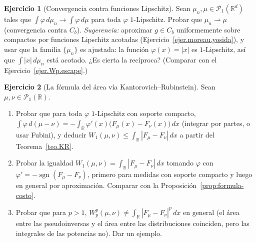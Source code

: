 \documentclass[12pt, a4paper]{amsbook}
\newcommand{\R}{{\mathbb R}}
\theoremstyle{remark}
\theoremstyle{definition}
\newtheorem{ejercicio}{Ejercicio}[chapter]
\numberwithin{section}{chapter}
\numberwithin{subsection}{section}
\numberwithin{equation}{section}
\numberwithin{figure}{chapter}
\begin{document}
\begin{ejercicio}[Convergencia contra funciones Lipschitz]\label{ejer.Wp.lipschitz}
Sean $\mu_n,\mu\in\mathcal P_1(\R^d)$ tales que
$\int\varphi\,d\mu_n\to\int\varphi\,d\mu$ para toda $\varphi$ $1$-Lipschitz.
Probar que $\mu_n\rightharpoonup\mu$ (convergencia contra $C_b$).
\emph{Sugerencia:} aproximar $g\in C_b$ uniformemente sobre compactos por
funciones Lipschitz acotadas (Ejercicio~\ref{ejer.moreau.yosida}), y usar
que la familia $\{\mu_n\}$ es ajustada: la función $\varphi(x)=|x|$ es
$1$-Lipschitz, así que $\int|x|\,d\mu_n$ está acotado.
¿Es cierta la recíproca? (Comparar con el Ejercicio~\ref{ejer.Wp.escape}.)
\end{ejercicio}

\begin{ejercicio}[La fórmula del área vía Kantorovich--Rubinstein]\label{ejer.KR.area}
Sean $\mu,\nu\in\mathcal P_1(\R)$.
\begin{enumerate}[label=(\alph*)]
\item Probar que para toda $\varphi$ $1$-Lipschitz con soporte compacto,
$\int\varphi\,d(\mu-\nu)=-\int_\R\varphi'(x)\bigl(F_\mu(x)-F_\nu(x)\bigr)\,dx$
(integrar por partes, o usar Fubini), y deducir
$W_1(\mu,\nu)\le\int_\R|F_\mu-F_\nu|\,dx$ a partir del
Teorema~\ref{teo.KR}.
\item Probar la igualdad $W_1(\mu,\nu)=\int_\R|F_\mu-F_\nu|\,dx$ tomando
$\varphi$ con $\varphi'=-\operatorname{sgn}(F_\mu-F_\nu)$, primero para
medidas con soporte compacto y luego en general por aproximación. Comparar
con la Proposición~\ref{prop:formula-costo}.
\item Probar que para $p>1$, $W_p^p(\mu,\nu)\ne\int_\R|F_\mu-F_\nu|^p\,dx$ en
general (el área entre las pseudoinversas y el área entre las distribuciones
coinciden, pero las integrales de las potencias no). Dar un ejemplo.
\end{enumerate}
\end{ejercicio}
\end{document}

